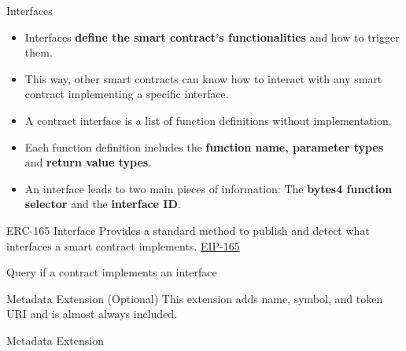 \documentclass[handout]{beamer}
\begin{document}
\begin{frame}{Interfaces}
\begin{itemize}
	\item Interfaces \textbf{define the smart contract's functionalities} and how to trigger them.
	\item This way, other smart contracts can know how to interact with any smart contract implementing a specific interface.
	\item A contract interface is a list of function definitions without implementation.
	\item Each function definition includes the \textbf{function name, parameter types} and \textbf{return value types}.
	\item An interface leads to two main pieces of information: The \textbf{bytes4 function selector} and the \textbf{interface ID}.
\end{itemize}
\end{frame}

\begin{frame}{ERC-165 Interface}
Provides a standard method to publish and detect what interfaces a smart contract implements. \link \href{https://eips.ethereum.org/EIPS/eip-165}{EIP-165}
\vspace{1em}
	\begin{samplecode}{Query if a contract implements an interface}
			
	\end{samplecode}
\vspace{1em}
\end{frame}

\begin{frame}{Metadata Extension (Optional)}
	This extension adds name, symbol, and token URI and is almost always included.
\vspace{0.5em}
	\begin{samplecode}{Metadata Extension}
		
	\end{samplecode}
\vspace{0.5em}
\end{frame}
\end{document}
